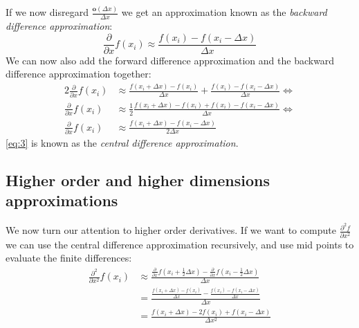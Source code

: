 If we now disregard $\frac{\mathbf{o}(\Delta x)}{\Delta x}$ we get an approximation known as the \textit{backward difference approximation}:
\begin{equation*}
	\frac{\partial}{\partial x}f(x_i) \approx \frac{f(x_i) - f(x_i - \Delta x)}{\Delta x}
\end{equation*}
We can now also add the forward difference approximation and the backward difference approximation together:
\begin{align}
	2\frac{\partial}{\partial x}f(x_i) &\approx \frac{f(x_i + \Delta x) - f(x_i)}{\Delta x} + \frac{f(x_i) - f(x_i - \Delta x)}{\Delta x} \iff\\
	\frac{\partial}{\partial x}f(x_i) & \approx \frac{1}{2}\frac{f(x_i + \Delta x) - f(x_i) + f(x_i) - f(x_i - \Delta x)}{\Delta x} \iff \\
	\frac{\partial}{\partial x}f(x_i) & \approx \frac{f(x_i + \Delta x) - f(x_i - \Delta x)}{2\Delta x} \label{eq:3}
\end{align}
\autoref{eq:3} is known as the \textit{central difference approximation}.

\subsection{Higher order and higher dimensions approximations}
We now turn our attention to higher order derivatives. If we want to compute $\frac{\partial^2 f}{\partial x^2}$ we can use the central difference approximation recursively, and use mid points to evaluate the finite differences:
\begin{align*}
	\frac{\partial^2}{\partial x^2}f(x_i) &\approx \frac{\frac{\partial}{\partial x}f(x_i + \frac{1}{2}\Delta x) - \frac{\partial}{\partial x}f(x_i - \frac{1}{2}\Delta x)}{\Delta x}\\
	& = \frac{\frac{f(x_i + \Delta x) - f(x_i)}{\Delta x} - \frac{f(x_i) - f(x_i - \Delta x)}{\Delta x}}{\Delta x}\\
	& =  \frac{f(x_i + \Delta x) - 2f(x_i) + f(x_i - \Delta x)}{\Delta x^2}
\end{align*}

